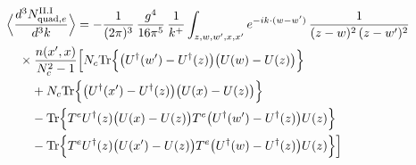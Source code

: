 \begingroup\small
\begin{align}\label{eq:S-II.I-2e}
&\Big\langle\frac{d^{3}N^{\rm II.I}_{{\rm quad},e}}{d^{3}k}\Big\rangle=-\frac{1}{(2\pi)^{3}}\, \frac{g^{4}}{16\pi^{5}}\, \frac{1}{k^{+}} \int_{z,w,w',x,x'}e^{-ik\cdot(w-w')}\, \frac{1}{(z-w)^{2}\,(z-w')^{2}}\notag\\
&\quad \times\frac{n(x',x)}{N_{c}^{2}-1}\Big[ N_{c}{\rm Tr}\Big\{\big(U^{\dagger}(w')-U^{\dagger}(z)\big)\big(U(w)-U(z)\big)\Big\}\notag\\
&\quad\quad +N_{c}{\rm Tr}\Big\{\big(U^{\dagger}(x')-U^{\dagger}(z)\big)\big(U(x)-U(z)\big)\Big\}\notag\\
&\quad\quad -{\rm Tr}\Big\{T^{e}U^{\dagger}(z)\big(U(x)-U(z)\big)T^{e}\big(U^{\dagger}(w')-U^{\dagger}(z)\big)U(z)\Big\}\notag\\
&\quad\quad -{\rm Tr}\Big\{T^{e}U^{\dagger}(z)\big(U(x')-U(z)\big)T^{e}\big(U^{\dagger}(w)-U^{\dagger}(z)\big)U(z)\Big\}\Big]
\end{align}
\endgroup

